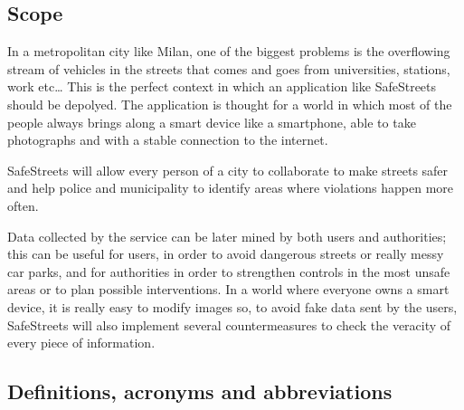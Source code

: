\subsection{Scope}
In a metropolitan city like Milan, one of the biggest problems is the overflowing stream of vehicles in the streets that comes and goes from universities, stations, work etc…  \newline
This is the perfect context in which an application like SafeStreets should be depolyed.  \newline
The application is thought for a world in which most of the people always brings along a smart device like a smartphone, able to take photographs and with a stable connection to the internet.  \newline\par
SafeStreets will allow every person of a city to collaborate to make streets safer and help police and municipality to identify areas where violations happen more often.  \newline\par
Data collected by the service can be later mined by both users and authorities; this can be useful for users, in order to avoid dangerous streets or really messy car parks, and for authorities in order to strengthen controls in the most unsafe areas or to plan possible interventions.  \newline
In a world where everyone owns a smart device, it is really easy to modify images so, to avoid fake data sent by the users, SafeStreets will also implement several countermeasures to check the veracity of every piece of information. 
\subsection{Definitions, acronyms and abbreviations }

